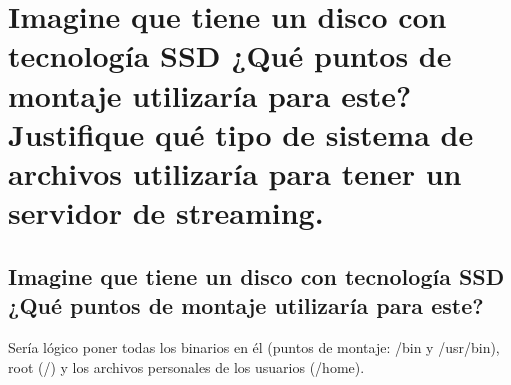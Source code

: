 \section{Imagine que tiene un disco con tecnología SSD ¿Qué puntos de montaje utilizaría para este? Justifique qué tipo de sistema de archivos utilizaría para tener un servidor de streaming.}

\subsection{Imagine que tiene un disco con tecnología SSD ¿Qué puntos de montaje utilizaría para este?}
Sería lógico poner todas los binarios en él (puntos de montaje: /bin y /usr/bin), root (/) y los archivos personales de los usuarios (/home).
